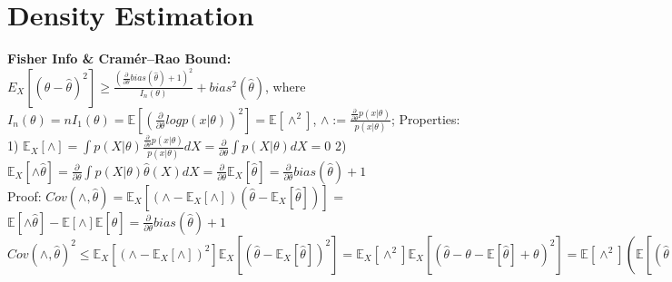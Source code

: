 \section{Density Estimation}
\textbf{Fisher Info \& Cramér–Rao Bound: } 
$E_X[(\theta - \hat{\theta})^2] \geq \frac{(\frac{\partial}{\partial \theta} bias(\hat{\theta}) + 1)^2}{I_n(\theta)} + bias^2(\hat{\theta})$, where \\
$I_n(\theta) = n I_1(\theta) = \mathbb{E}[(\frac{\partial}{\partial \theta}log p(x | \theta))^2] = \mathbb{E}[\wedge ^ 2]$, $\wedge := \frac{\frac{\partial}{\partial \theta}p(x | \theta)}{p(x | \theta)}$;
Properties: 1) $\mathbb{E}_{X} [\wedge] = \int p(X|\theta) \frac{\frac{\partial}{\partial \theta}p(x | \theta)}{p(x | \theta)} dX = \frac{\partial}{\partial \theta} \int p(X|\theta) dX = 0$
2) $\mathbb{E}_{X} [\wedge \hat{\theta}] = \frac{\partial}{\partial \theta} \int p(X|\theta) \hat{\theta}(X) dX = \frac{\partial}{\partial \theta} \mathbb{E}_X [\hat{\theta}] = \frac{\partial}{\partial \theta} bias(\hat{\theta}) + 1$ \\
Proof: $Cov(\wedge, \hat{\theta}) = \mathbb{E}_X[(\wedge - \mathbb{E}_X[\wedge])(\hat{\theta} - \mathbb{E}_X[\hat{\theta}])]$ = $\mathbb{E}[\wedge \hat{\theta}] - \mathbb{E}[\wedge]\mathbb{E}[\hat{\theta}] = \frac{\partial}{\partial \theta} bias(\hat{\theta}) + 1$ \\
$Cov(\wedge, \hat{\theta})^2 \leq \mathbb{E}_X[(\wedge - \mathbb{E}_X[\wedge])^2]\mathbb{E}_X[(\hat{\theta} - \mathbb{E}_X[\hat{\theta}])^2] = \mathbb{E}_X[\wedge^2]\mathbb{E}_X[(\hat{\theta} - \theta - \mathbb{E}[\hat{\theta}] + \theta)^2] = \mathbb{E}[\wedge^2](\mathbb{E}[(\hat{\theta} - \theta)^2] - bias^2(\hat{\theta}))$
\\

